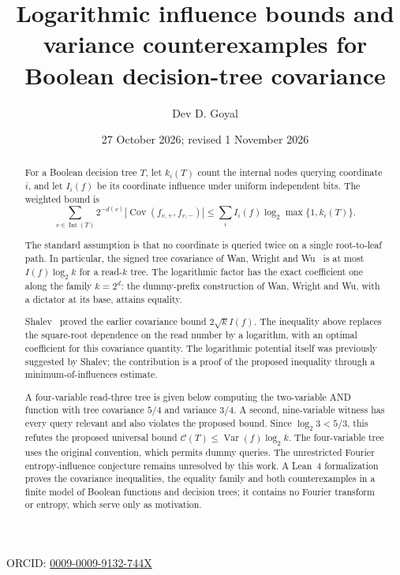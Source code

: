 \documentclass[
  american,
  11pt,
]{article}
\title{Logarithmic influence bounds and variance counterexamples for
Boolean decision-tree covariance}
\author{Dev D. Goyal}
\date{27 October 2026; revised 1 November 2026}
\begin{document}
\maketitle

\begin{center}
\small ORCID: \href{https://orcid.org/0009-0009-9132-744X}{0009-0009-9132-744X}
\end{center}

\begin{abstract}
For a Boolean decision tree \(T\), let \(k_i(T)\) count the internal
nodes querying coordinate \(i\), and let \(I_i(f)\) be its coordinate
influence under uniform independent bits. The weighted bound is \[
\sum_{v\in\operatorname{Int}(T)}2^{-d(v)}
 \left|\operatorname{Cov}(f_{v,+},f_{v,-})\right|
\leq \sum_i I_i(f)\log_2\max\{1,k_i(T)\}.
\tag{A}
\]

The standard assumption is that no coordinate is queried twice on a
single root-to-leaf path. In particular, the signed tree covariance of
Wan, Wright and Wu~\cite{WWW} is at most \(I(f)\log_2 k\) for a read-\(k\) tree.
The logarithmic factor has the exact coefficient one along the family
\(k=2^d\): the dummy-prefix construction of Wan, Wright and Wu, with a
dictator at its base, attains equality.

Shalev~\cite{Shalev} proved the earlier covariance bound \(2\sqrt{k}I(f)\). The
inequality above replaces the square-root dependence on the read number
by a logarithm, with an optimal coefficient for this covariance
quantity. The logarithmic potential itself was previously suggested by
Shalev; the contribution is a proof of the proposed inequality through a
minimum-of-influences estimate.

A four-variable read-three tree is given below computing the two-variable AND
function with tree covariance \(5/4\) and variance \(3/4\). A second,
nine-variable witness has every query relevant and also violates the
proposed bound. Since \(\log_2 3<5/3\), this refutes the proposed
universal bound \(\mathcal C(T)\leq\operatorname{Var}(f)\log_2 k\). The
four-variable tree uses the original convention, which permits dummy
queries. The unrestricted Fourier entropy-influence conjecture remains
unresolved by this work. A Lean~4 formalization proves the covariance
inequalities, the equality family and both counterexamples in a finite
model of Boolean functions and decision trees; it contains no Fourier
transform or entropy, which serve only as motivation.
\end{abstract}
\end{document}
